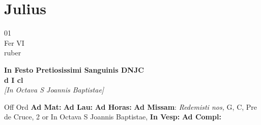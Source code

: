 \documentclass[10pt, openany]{book}
\begin{document}
        \chapter{Julius}
                        
        \begin{center}
            \begin{minipage}{3.5in}
                \vspace{2em}
                \begin{minipage}{0.5in}
                    {\Huge 01} \\
                    {\normalsize Fer VI} \\
                    {\normalsize ruber}
                \end{minipage}
                \begin{minipage}{3.0in}
                    \textbf{ \large In Festo Pretiosissimi Sanguinis DNJC \\
                    \textnormal{\normalsize d I cl}} \\ \textit{[In Octava S Joannis Baptistae]} \\ 
                \end{minipage}
                \begin{justify}Off Ord
                    \textbf{Ad Mat: }
                    \textbf{Ad Lau: }
                    \textbf{Ad Horas: }\textbf{Ad Missam}: \textit{Redemisti nos,} G, C, Pre de Cruce, 2 or In Octava S Joannis Baptistae,  
                    \textbf{In Vesp: }
                    \textbf{Ad Compl: }
                \end{justify}
            \end{minipage}
        \end{center}
    
\end{document}
